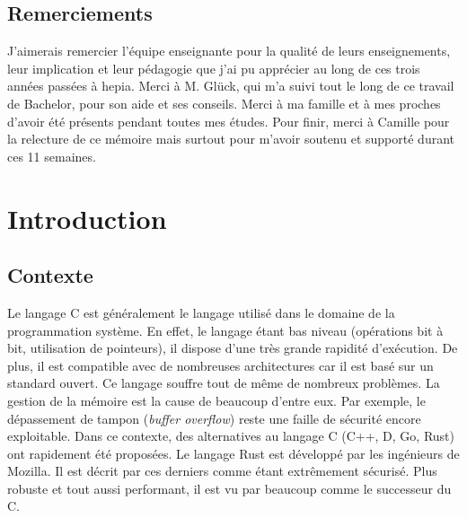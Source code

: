\documentclass[a4paper, 12pt]{article}
\begin{document}
\subsection*{Remerciements}
J'aimerais remercier l'équipe enseignante pour la qualité de leurs enseignements,
leur implication et leur pédagogie que j'ai pu apprécier au long de ces trois
années passées à hepia. Merci à M. Glück, qui m'a suivi tout le long de ce travail
de Bachelor, pour son aide et ses conseils. Merci à ma famille et à mes proches
d'avoir été présents pendant toutes mes études. Pour finir, merci à Camille pour la
relecture de ce mémoire mais surtout pour m'avoir soutenu et supporté durant ces
11 semaines.


\newpage
\section{Introduction}
\subsection{Contexte}
Le langage C est généralement le langage utilisé dans le domaine de la programmation
système. En effet, le langage étant bas niveau (opérations bit à bit, utilisation
de pointeurs), il dispose d'une très grande rapidité d'exécution. De plus, il est
compatible avec de nombreuses architectures car il est basé sur un standard ouvert.
Ce langage souffre tout de même de nombreux problèmes. La gestion de la mémoire
est la cause de beaucoup d'entre eux. Par exemple, le dépassement de tampon
(\textit{buffer overflow}) reste une faille de sécurité encore exploitable.
Dans ce contexte, des alternatives au langage C (C++, D, Go, Rust) ont rapidement
été proposées. Le langage Rust est développé par les ingénieurs de Mozilla. Il
est décrit par ces derniers comme étant extrêmement sécurisé. Plus robuste et tout
aussi performant, il est vu par beaucoup comme le successeur du C.

\end{document}
